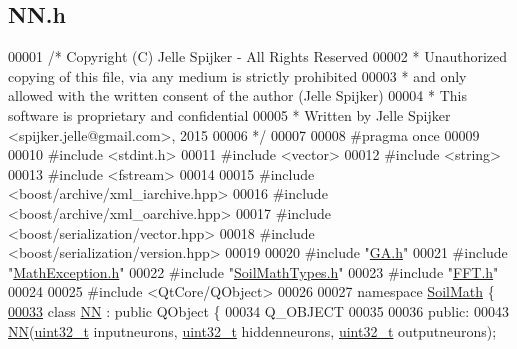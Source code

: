 \hypertarget{_n_n_8h_source}{}\subsection{N\+N.\+h}
\label{_n_n_8h_source}

\begin{DoxyCode}
00001 \textcolor{comment}{/* Copyright (C) Jelle Spijker - All Rights Reserved}
00002 \textcolor{comment}{ * Unauthorized copying of this file, via any medium is strictly prohibited}
00003 \textcolor{comment}{ * and only allowed with the written consent of the author (Jelle Spijker)}
00004 \textcolor{comment}{ * This software is proprietary and confidential}
00005 \textcolor{comment}{ * Written by Jelle Spijker <spijker.jelle@gmail.com>, 2015}
00006 \textcolor{comment}{ */}
00007 
00008 \textcolor{preprocessor}{#pragma once}
00009 
00010 \textcolor{preprocessor}{#include <stdint.h>}
00011 \textcolor{preprocessor}{#include <vector>}
00012 \textcolor{preprocessor}{#include <string>}
00013 \textcolor{preprocessor}{#include <fstream>}
00014 
00015 \textcolor{preprocessor}{#include <boost/archive/xml\_iarchive.hpp>}
00016 \textcolor{preprocessor}{#include <boost/archive/xml\_oarchive.hpp>}
00017 \textcolor{preprocessor}{#include <boost/serialization/vector.hpp>}
00018 \textcolor{preprocessor}{#include <boost/serialization/version.hpp>}
00019 
00020 \textcolor{preprocessor}{#include "\hyperlink{_g_a_8h}{GA.h}"}
00021 \textcolor{preprocessor}{#include "\hyperlink{_math_exception_8h}{MathException.h}"}
00022 \textcolor{preprocessor}{#include "\hyperlink{_soil_math_types_8h}{SoilMathTypes.h}"}
00023 \textcolor{preprocessor}{#include "\hyperlink{_f_f_t_8h}{FFT.h}"}
00024 
00025 \textcolor{preprocessor}{#include <QtCore/QObject>}
00026 
00027 \textcolor{keyword}{namespace }\hyperlink{namespace_soil_math}{SoilMath} \{
\hypertarget{_n_n_8h_source_l00033}{}\hyperlink{class_soil_math_1_1_n_n}{00033} \textcolor{keyword}{class }\hyperlink{class_soil_math_1_1_n_n}{NN} : \textcolor{keyword}{public} QObject \{
00034   Q\_OBJECT
00035 
00036 \textcolor{keyword}{public}:
00043   \hyperlink{class_soil_math_1_1_n_n_a778606ea8a193479da233a030d1df234}{NN}(\hyperlink{_soil_math_types_8h_a435d1572bf3f880d55459d9805097f62}{uint32\_t} inputneurons, \hyperlink{_soil_math_types_8h_a435d1572bf3f880d55459d9805097f62}{uint32\_t} hiddenneurons, \hyperlink{_soil_math_types_8h_a435d1572bf3f880d55459d9805097f62}{uint32\_t} outputneurons);

\end{DoxyCode}
